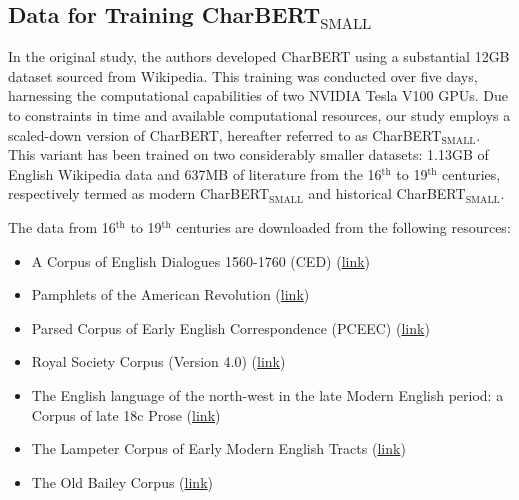 \subsection{Data for Training CharBERT$_{\text{SMALL}}$}
\label{subsec:3_data_for_training_charbert}
In the original study, the authors developed CharBERT using a substantial 12GB dataset sourced from Wikipedia. This training was conducted over five days, harnessing the computational capabilities of two NVIDIA Tesla V100 GPUs. Due to constraints in time and available computational resources, our study employs a scaled-down version of CharBERT, hereafter referred to as CharBERT$_{\text{SMALL}}$. This variant has been trained on two considerably smaller datasets: 1.13GB of English Wikipedia data and 637MB of literature from the 16$^{\text{th}}$ to 19$^{\text{th}}$ centuries, respectively termed as modern CharBERT$_{\text{SMALL}}$ and historical CharBERT$_{\text{SMALL}}$.

The data from 16$^{\text{th}}$ to 19$^{\text{th}}$ centuries are downloaded from the following resources:

\begin{itemize}
    \setlength\itemsep{0em}
    \item A Corpus of English Dialogues 1560-1760 (CED) \citep{20.500.14106/2507} (\href{https://llds.ling-phil.ox.ac.uk/llds/xmlui/handle/20.500.14106/2507}{link})
    \item Pamphlets of the American Revolution \citep{20.500.14106/2021} (\href{http://hdl.handle.net/20.500.14106/2021}{link})
    \item Parsed Corpus of Early English Correspondence (PCEEC) \citep{20.500.14106/2510} (\href{http://hdl.handle.net/20.500.14106/2510}{link})
    \item Royal Society Corpus (Version 4.0) \citep{kermes2016royal} (\href{http://hdl.handle.net/21.11119/0000-0001-7E8B-6}{link})
    \item The English language of the north-west in the late Modern English period: a Corpus of late 18c Prose \citep{20.500.14106/2468} (\href{http://hdl.handle.net/20.500.14106/2468}{link})
    \item The Lampeter Corpus of Early Modern English Tracts \citep{20.500.14106/3193} (\href{http://hdl.handle.net/20.500.14106/3193}{link})
    \item The Old Bailey Corpus \citep{hubernisselpuga2016} (\href{http://hdl.handle.net/11858/00-246C-0000-0023-8CFB-2}{link})
\end{itemize}

